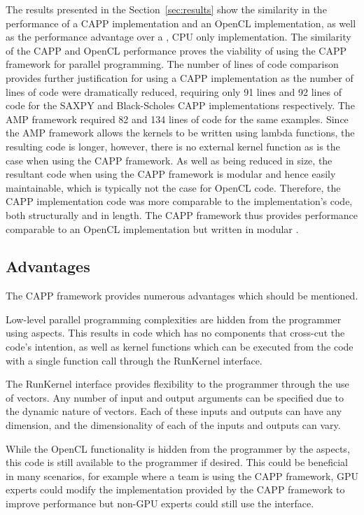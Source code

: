 \documentclass{sig-alternate-05-2015}
\begin{document}
The results presented in the Section~\ref{sec:results} show the similarity in
the performance of a CAPP implementation and an OpenCL implementation, as
well as the performance advantage over a \CPP, CPU only implementation. The
similarity of the CAPP and OpenCL performance proves the viability of
using the  CAPP framework for parallel programming. The number of lines of 
code comparison provides further justification for using a CAPP
implementation as the number of lines of \CPP code were dramatically
reduced, requiring only 91 lines and 92 lines of \CPP code for the SAXPY and
Black-Scholes CAPP implementations respectively. The \CPP AMP framework required 82 and 134 lines of \CPP code for the
same examples. Since the \CPP AMP framework allows the kernels to be written using \CPP
lambda functions, the resulting \CPP code is longer, however, there is no external kernel function as is the
case when using the CAPP framework.
As well as being reduced in size, the resultant \CPP code when using the CAPP framework is modular and hence easily maintainable, 
which is typically not the case for OpenCL code. Therefore,
the CAPP implementation code was more comparable to the \CPP implementation's code,
both structurally and in length. The  CAPP framework thus provides
performance comparable to an OpenCL implementation but written in modular \CPP.

\subsection{Advantages}

The  CAPP framework provides numerous advantages which should be mentioned.

Low-level parallel programming complexities are hidden from the programmer using aspects. 
This results in \CPP code which has no components that cross-cut the code's intention, as 
well as kernel functions which can be executed from the \CPP code with a single
function call through the RunKernel interface. 

The RunKernel interface provides flexibility to the programmer through the use
of vectors. Any number of input and output arguments can be specified due to
the dynamic nature of vectors. Each of these inputs and outputs can have any 
dimension, and the dimensionality of each of the inputs and outputs can vary.

While the OpenCL functionality is hidden from the programmer by the aspects,
this code is still available to the programmer if desired. This could be
beneficial in many scenarios, for example where a team is using the
 CAPP framework, GPU experts could modify the implementation provided by the
 CAPP framework to improve performance but non-GPU experts could still use
the \CPP interface.  
\end{document}
